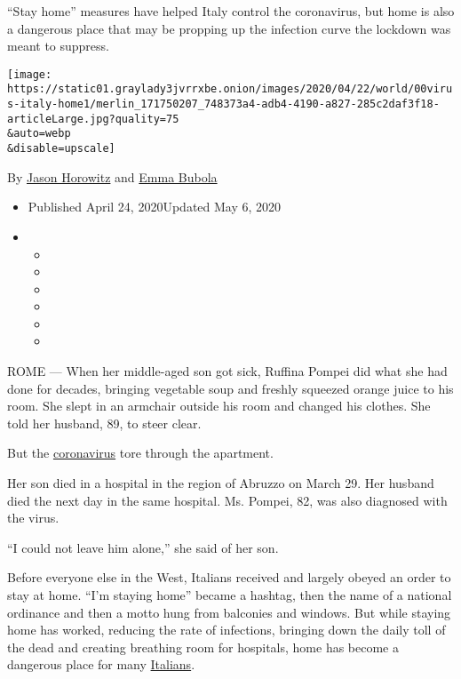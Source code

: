``Stay home'' measures have helped Italy control the coronavirus, but
home is also a dangerous place that may be propping up the infection
curve the lockdown was meant to suppress.

\texttt{[image: https://static01.graylady3jvrrxbe.onion/images/2020/04/22/world/00virus-italy-home1/merlin\_171750207\_748373a4-adb4-4190-a827-285c2daf3f18-articleLarge.jpg?quality=75\\\&auto=webp\\\&disable=upscale]}

By \href{https://www.nytimes3xbfgragh.onion/by/jason-horowitz}{Jason
Horowitz} and
\href{https://www.nytimes3xbfgragh.onion/by/emma-bubola}{Emma Bubola}

\begin{itemize}
\item
  Published April 24, 2020Updated May 6, 2020
\item
  \begin{itemize}
  \item
  \item
  \item
  \item
  \item
  \item
  \end{itemize}
\end{itemize}

ROME --- When her middle-aged son got sick, Ruffina Pompei did what she
had done for decades, bringing vegetable soup and freshly squeezed
orange juice to his room. She slept in an armchair outside his room and
changed his clothes. She told her husband, 89, to steer clear.

But the
\href{https://www.nytimes3xbfgragh.onion/2020/05/06/world/europe/italy-coronavirus-reopening-parents.html}{coronavirus}
tore through the apartment.

Her son died in a hospital in the region of Abruzzo on March 29. Her
husband died the next day in the same hospital. Ms. Pompei, 82, was also
diagnosed with the virus.

``I could not leave him alone,'' she said of her son.

Before everyone else in the West, Italians received and largely obeyed
an order to stay at home. ``I'm staying home'' became a hashtag, then
the name of a national ordinance and then a motto hung from balconies
and windows. But while staying home has worked, reducing the rate of
infections, bringing down the daily toll of the dead and creating
breathing room for hospitals, home has become a dangerous place for many
\href{https://www.nytimes3xbfgragh.onion/2020/05/29/world/europe/italy-young-people-coronavirus.html}{Italians}.

